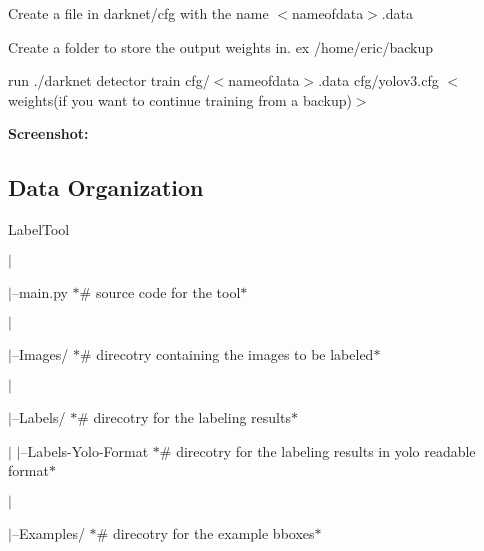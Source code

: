 \begin{DoxyItemize}
\item Create a file in darknet/cfg with the name $<$nameofdata$>$.data
\item Create a folder to store the output weights in. ex /home/eric/backup 
\begin{DoxyCode}{0}
\end{DoxyCode}

\end{DoxyItemize}
\begin{DoxyEnumerate}
\item run {\ttfamily ./darknet detector train cfg/$<$nameofdata$>$.data cfg/yolov3.\+cfg $<$weights(if you want to continue training from a backup)$>$}
\end{DoxyEnumerate}

{\bfseries{Screenshot\+:}} 

\subsection*{Data Organization }

Label\+Tool

$\vert$

$\vert$--main.\+py $\ast$\# source code for the tool$\ast$

$\vert$

$\vert$--Images/ $\ast$\# direcotry containing the images to be labeled$\ast$

$\vert$

$\vert$--Labels/ $\ast$\# direcotry for the labeling results$\ast$

$\vert$ $\vert$--Labels-\/\+Yolo-\/\+Format $\ast$\# direcotry for the labeling results in yolo readable format$\ast$

$\vert$

$\vert$--Examples/ $\ast$\# direcotry for the example bboxes$\ast$ 